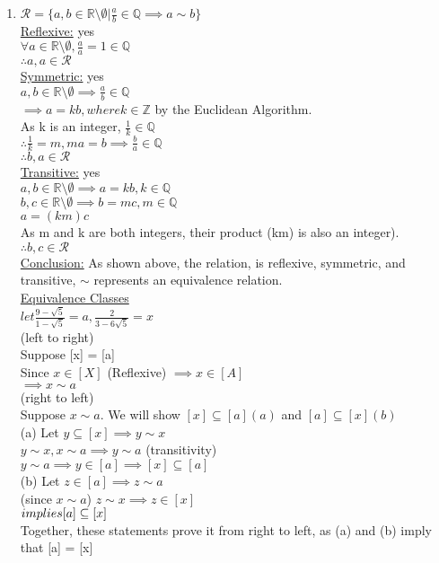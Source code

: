 \documentclass{article}
\theoremstyle{definition}
\begin{document}
\begin{enumerate}[label = \alph*)]
    \item $\mathcal{R} = \{a, b \in \mathbb{R}\setminus \emptyset | \frac{a}{b} \in \mathbb{Q} \implies a \sim b\}$\\
    \underline{Reflexive:} yes\\
    $\forall a \in \mathbb{R}\setminus \emptyset, \frac{a}{a} = 1\in \mathbb{Q}$\\
    $\therefore a, a \in \mathcal{R}$\\
    \underline{Symmetric:} yes\\
    $a, b \in \mathbb{R}\setminus \emptyset \implies \frac{a}{b} \in \mathbb{Q}$\\
    $\implies a = kb, where k\in \mathbb{Z}$ by the Euclidean Algorithm.\\
    As k is an integer, $\frac{1}{k} \in \mathbb{Q}$\\
    $\therefore \frac{1}{k} = m, ma = b \implies \frac{b}{a} \in \mathbb{Q}$\\
    $\therefore b, a \in \mathcal{R}$\\
    \underline{Transitive:} yes\\
    $a, b \in \mathbb{R} \setminus \emptyset \implies a=kb, k\in \mathbb{Q}$\\
    $b, c \in \mathbb{R} \setminus \emptyset \implies b=mc, m\in \mathbb{Q}$\\
    $a=(km)c$\\
    As m and k are both integers, their product (km) is also an integer).\\
    $\therefore b, c \in \mathcal{R}$\\
    \underline{Conclusion:} As shown above, the relation, is reflexive, symmetric, and transitive, $\sim$ represents an equivalence relation.
    \\
    \underline{Equivalence Classes}\\
    $let \frac{9 - \sqrt{5}}{1-\sqrt{5}} = a, \frac{2}{3-6\sqrt{5}} = x$\\
    (left to right)\\
    Suppose [x] = [a]\\
    Since $x\in [X]$ (Reflexive) $\implies x\in[A]$\\
    $\implies x\sim a$\\
    (right to left)\\
    Suppose $x\sim a$. We will show $[x]\subseteq [a] (a)$ and $[a]\subseteq [x] (b)$\\
    (a) Let $y\subseteq [x] \implies y\sim x$\\
    $y\sim x, x\sim a \implies y \sim a$ (transitivity)\\
    $y\sim a\implies y \in [a] \implies [x] \subseteq [a]$\\
    (b) Let $z\in [a] \implies z \sim a$\\
    (since $x\sim a$) $z\sim x \implies z \in [x]$\\
    $\\implies [a] \subseteq [x]$\\
    Together, these statements prove it from right to left, as (a) and (b) imply that [a] = [x]
\end{enumerate}
\end{document}
